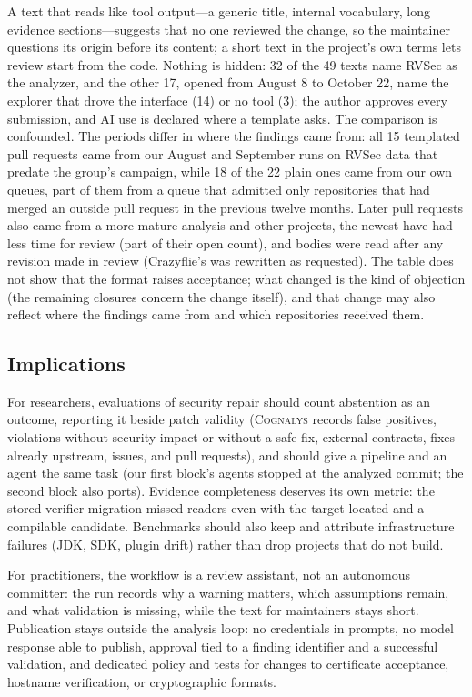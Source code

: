 \documentclass[conference]{IEEEtran}
\newcommand{\system}{\textsc{Cognalys}}
\begin{document}
A text that reads like tool output---a generic title, internal vocabulary,
long evidence sections---suggests that no one reviewed the change, so the
maintainer questions its origin before its content; a short text in the
project's own terms lets review start from the code. Nothing is hidden: 32 of the 49
texts name RVSec as the analyzer, and the other 17, opened from August 8 to
October 22, name the explorer that drove the interface (14) or no tool (3); the
author approves every submission, and AI use is declared where a template asks. The comparison is confounded. The
periods differ in where the findings came from: all 15 templated pull requests
came from our August and September runs on RVSec data that predate the group's
campaign, while 18 of the 22 plain ones came from our own queues, part of them
from a queue that admitted only repositories that had merged an outside pull
request in the previous twelve months. Later pull requests also came from a
more mature analysis and other projects, the newest have had less time for
review (part of their open count), and bodies were read after any revision made
in review (Crazyflie's was rewritten as requested). The table does not show
that the format raises acceptance; what changed is the kind of objection (the
remaining closures concern the change itself), and that change may also
reflect where the findings came from and which repositories received them.

\subsection{Implications}

For researchers, evaluations of security repair should count abstention as an
outcome, reporting it beside patch validity (\system{} records false
positives, violations without security impact or without a safe fix, external
contracts, fixes already upstream, issues, and pull requests), and should give
a pipeline and an agent the same task (our first block's agents stopped at the
analyzed commit; the second block also ports). Evidence completeness
deserves its own metric: the stored-verifier migration missed readers even
with the target located and a compilable candidate. Benchmarks should also
keep and attribute infrastructure failures (JDK, SDK, plugin drift) rather
than drop projects that do not build.

For practitioners, the workflow is a review assistant, not an autonomous
committer: the run records why a warning matters, which assumptions remain,
and what validation is missing, while the text for maintainers stays short.
Publication stays outside the analysis loop: no credentials in prompts, no
model response able to publish, approval tied to a finding identifier and a
successful validation, and dedicated policy and tests for changes to certificate
acceptance, hostname verification, or cryptographic formats.
\end{document}

